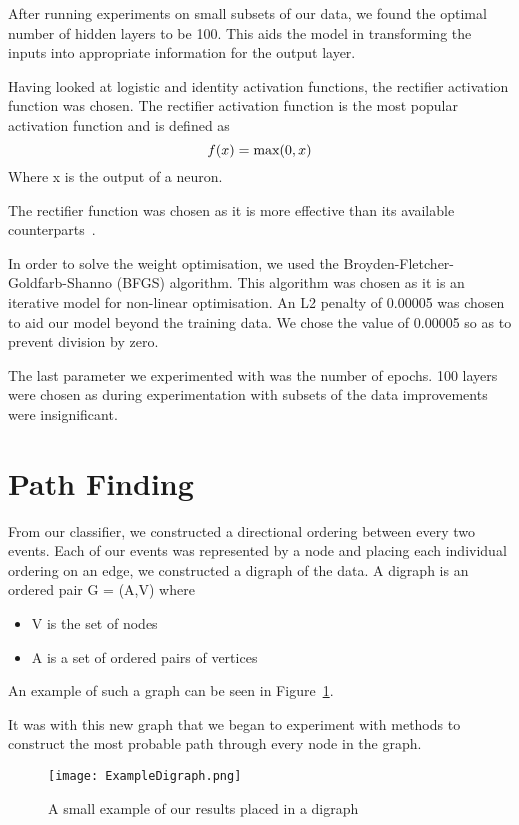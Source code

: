 \documentclass[bsc,frontabs,twoside,singlespacing,parskip,deptreport]{infthesis}     %
\begin{document}
 After running experiments on  small subsets of our data, we found the optimal number of hidden layers to be 100. 
 This aids the model in transforming the inputs into appropriate information for the output layer.
 
 Having looked at logistic and identity activation functions, the rectifier activation function was chosen.
 The rectifier activation function is the most popular activation function \cite{lecun2015deep} and is defined as
 \begin{equation}
   f(x) = \text{max}(0,x)\nonumber\\
 \end{equation}
 Where x is the output of a neuron.
 
 The rectifier function was chosen as it is more effective than its available counterparts~\cite{glorot2011deep}.

 In order to solve the weight optimisation, we used the Broyden-Fletcher-Goldfarb-Shanno (BFGS) algorithm.
 This algorithm was chosen as it is an iterative model for non-linear optimisation.
 An L2 penalty of 0.00005 was chosen to aid our model beyond the training data.
 We chose the value of 0.00005 so as to prevent division by zero. 

 The last parameter we experimented with was the number of epochs.
 100 layers were chosen as during experimentation with subsets of the data improvements were
 insignificant.

 \section{Path Finding} \label{chapter:graphing}
From our classifier, we constructed a directional ordering between every two events.
Each of our events was represented by a node and placing each individual ordering on an edge, we constructed
a digraph of the data.
A digraph is an ordered pair G = (A,V) where~\cite{bang2008digraphs}
\begin{itemize}
  \item V is the set of nodes
  \item A is a set of ordered pairs of vertices
\end{itemize}
An example of such a graph can be seen in Figure~\ref{fig:digraph}.

It was with this new graph that we began to experiment with methods to construct the most probable path through every
node in the graph.


\begin{figure}[H]
  \centering
  \texttt{[image: ExampleDigraph.png]}
  \caption{A small example of our results placed in a digraph}
  \label{fig:digraph}
 \end{figure}
\end{document}
